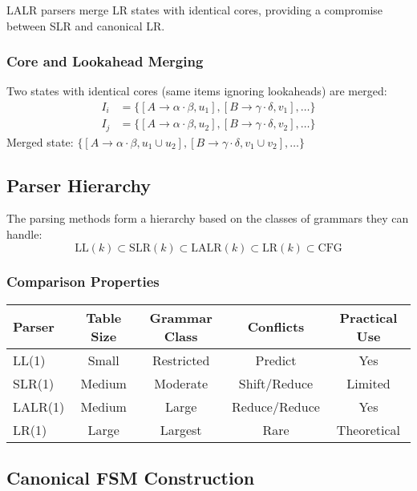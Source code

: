 LALR parsers merge LR states with identical cores, providing a compromise between SLR and canonical LR.

\subsubsection{Core and Lookahead Merging}
Two states with identical cores (same items ignoring lookaheads) are merged:
\begin{align}
I_i &= \{[A \to \alpha \cdot \beta, u_1], [B \to \gamma \cdot \delta, v_1], \ldots\} \\
I_j &= \{[A \to \alpha \cdot \beta, u_2], [B \to \gamma \cdot \delta, v_2], \ldots\}
\end{align}
Merged state: $\{[A \to \alpha \cdot \beta, u_1 \cup u_2], [B \to \gamma \cdot \delta, v_1 \cup v_2], \ldots\}$

\subsection{Parser Hierarchy}

The parsing methods form a hierarchy based on the classes of grammars they can handle:
$$\text{LL}(k) \subset \text{SLR}(k) \subset \text{LALR}(k) \subset \text{LR}(k) \subset \text{CFG}$$

\subsubsection{Comparison Properties}
\begin{center}
\begin{tabular}{|l|c|c|c|c|}
\hline
\textbf{Parser} & \textbf{Table Size} & \textbf{Grammar Class} & \textbf{Conflicts} & \textbf{Practical Use} \\
\hline
LL(1) & Small & Restricted & Predict & Yes \\
SLR(1) & Medium & Moderate & Shift/Reduce & Limited \\
LALR(1) & Medium & Large & Reduce/Reduce & Yes \\
LR(1) & Large & Largest & Rare & Theoretical \\
\hline
\end{tabular}
\end{center}

\subsection{Canonical FSM Construction}

